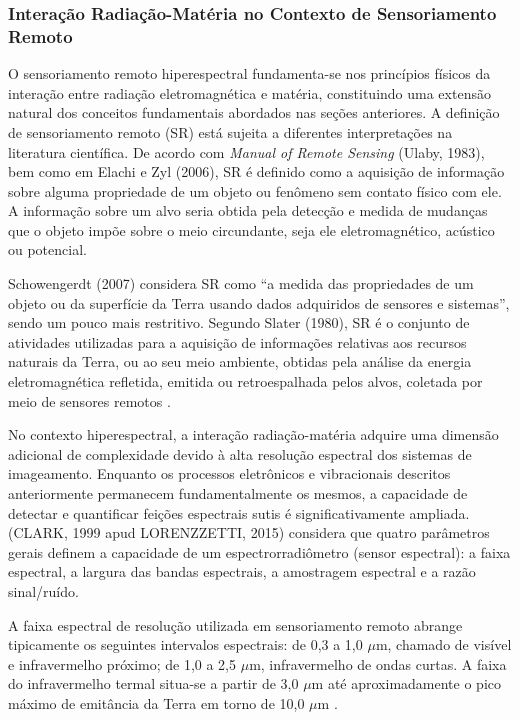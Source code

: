 \subsubsection{Interação Radiação-Matéria no Contexto de Sensoriamento Remoto}

O sensoriamento remoto hiperespectral fundamenta-se nos princípios físicos 
da interação entre radiação eletromagnética e matéria, constituindo uma 
extensão natural dos conceitos fundamentais abordados nas seções anteriores. 
A definição de sensoriamento remoto (SR) está sujeita a diferentes 
interpretações na literatura científica. De acordo com \textit{Manual of 
Remote Sensing} (Ulaby, 1983), bem como em Elachi e Zyl (2006), SR é 
definido como a aquisição de informação sobre alguma propriedade de um 
objeto ou fenômeno sem contato físico com ele. A informação sobre um alvo 
seria obtida pela detecção e medida de mudanças que o objeto impõe sobre o 
meio circundante, seja ele eletromagnético, acústico ou potencial.

Schowengerdt (2007) considera SR como ``a medida das propriedades de um 
objeto ou da superfície da Terra usando dados adquiridos de sensores e 
sistemas'', sendo um pouco mais restritivo. Segundo Slater (1980), SR é o 
conjunto de atividades utilizadas para a aquisição de informações relativas 
aos recursos naturais da Terra, ou ao seu meio ambiente, obtidas pela 
análise da energia eletromagnética refletida, emitida ou retroespalhada 
pelos alvos, coletada por meio de sensores remotos \cite{Baptista2019}.

No contexto hiperespectral, a interação radiação-matéria adquire uma 
dimensão adicional de complexidade devido à alta resolução espectral dos 
sistemas de imageamento. Enquanto os processos eletrônicos e vibracionais 
descritos anteriormente permanecem fundamentalmente os mesmos, a capacidade 
de detectar e quantificar feições espectrais sutis é significativamente 
ampliada. (CLARK, 1999 apud LORENZZETTI, 2015) considera que quatro 
parâmetros gerais definem a capacidade de um espectrorradiômetro (sensor 
espectral): a faixa espectral, a largura das bandas espectrais, a 
amostragem espectral e a razão sinal/ruído.

A faixa espectral de resolução utilizada em sensoriamento remoto abrange 
tipicamente os seguintes intervalos espectrais: de 0,3 a 1,0 $\mu$m, 
chamado de visível e infravermelho próximo; de 1,0 a 2,5 $\mu$m, 
infravermelho de ondas curtas. A faixa do infravermelho termal situa-se a 
partir de 3,0 $\mu$m até aproximadamente o pico máximo de emitância da 
Terra em torno de 10,0 $\mu$m \cite{Lorenzzetti2015}.

